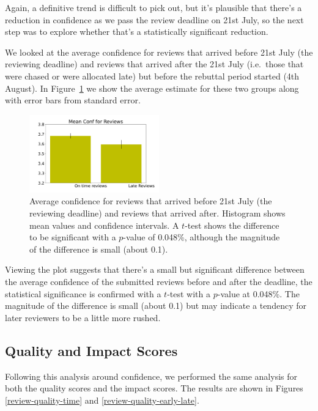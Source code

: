 Again, a definitive trend is difficult to pick out, but it's plausible that there's a reduction in confidence as we pass the review deadline on 21st July, so the next step was to explore whether that's a statistically significant reduction.

We looked at the average confidence for
reviews that arrived before 21st July (the reviewing deadline) and
reviews that arrived after the 21st July (i.e.~those that were chased or
were allocated late) but before the rebuttal period started (4th
August). In Figure~\ref{review-confidence-early-late} we show the average estimate for these two groups along with error bars from standard error.

\begin{figure}[htb]
\centering
\includegraphics[width=0.50\textwidth]{diagrams/neurips/review-confidence-early-late.pdf}

\caption{Average confidence for reviews that arrived
before 21st July (the reviewing deadline) and reviews that arrived
after. Histogram shows mean values and confidence intervals. A
\(t\)-test shows the difference to be significant with a \(p\)-value of
0.048\%, although the magnitude of the difference is small (about
0.1).} \label{review-confidence-early-late}
\end{figure}

Viewing the plot suggests that there's a small but significant difference between
the average confidence of the submitted reviews before and after the
deadline, the statistical significance is confirmed with a \(t\)-test
with a \(p\)-value at 0.048\%. The magnitude of the difference is small
(about 0.1) but may indicate a tendency for later reviewers to be a
little more rushed.

\subsection{Quality and Impact Scores}\label{quality-score}

Following this analysis around confidence, we performed the same analysis for both the quality scores and the impact scores. The results are shown in Figures
\ref{review-quality-time} and \ref{review-quality-early-late}.

